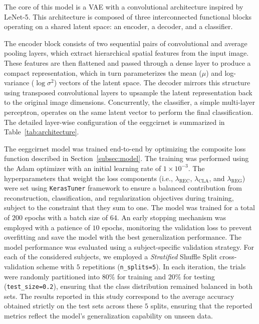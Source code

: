 The core of this model is a VAE with a convolutional architecture inspired by LeNet-5. This architecture is composed of three interconnected functional blocks operating on a shared latent space: an encoder, a decoder, and a classifier. 

The encoder block consists of two sequential pairs of convolutional and average pooling layers, which extract hierarchical spatial features from the input image. These features are then flattened and passed through a dense layer to produce a compact representation, which in turn parameterizes the mean ($\mu$) and log-variance ($\log\sigma^2$) vectors of the latent space. The decoder mirrors this structure using transposed convolutional layers to upsample the latent representation back to the original image dimensions. Concurrently, the classifier, a simple multi-layer perceptron, operates on the same latent vector to perform the final classification. The detailed layer-wise configuration of the \gls{eeggcirnet} is summarized in Table~\ref{tab:architecture}.

The \gls{eeggcirnet} model was trained end-to-end by optimizing the composite loss function described in Section~\ref{subsec:model}. The training was performed using the Adam optimizer with an initial learning rate of $1 \times 10^{-3}$. The hyperparameters that weight the loss components (i.e., $\lambda_{\text{REC}}$, $\lambda_{\text{CLA}}$, and $\lambda_{\text{REG}}$) were set using
 \texttt{KerasTuner} framework to ensure a balanced contribution from reconstruction, classification, and regularization objectives during training, subject to the constraint that they sum to one. The model was trained for a total of $200$ epochs with a batch size of $64$. An early stopping mechanism was employed with a patience of $10$ epochs, monitoring the validation loss to prevent overfitting and save the model with the best generalization performance. The model performance was evaluated using a subject-specific validation strategy. {For each of the considered subjects, we employed a \textit{Stratified} Shuffle Split
  cross-validation scheme with $5$ repetitions (\texttt{n\_splits=5}).} In each iteration, the trials were randomly partitioned into $80\%$ for training and $20\%$ for testing (\texttt{test\_size=0.2}), ensuring that the class distribution remained balanced in both sets. The results reported in this study correspond to the average accuracy obtained strictly on the {test sets} across these $5$ splits, ensuring that the reported metrics reflect the model's generalization capability on unseen data.

